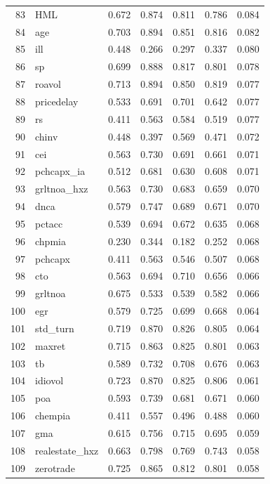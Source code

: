 \begin{footnotesize}
\begin{longtable}{rl|c|c|c|c|c}
		83 & HML & 0.672 & 0.874 & 0.811 & 0.786 & 0.084 \\ 
		84 & age & 0.703 & 0.894 & 0.851 & 0.816 & 0.082 \\ 
		85 & ill & 0.448 & 0.266 & 0.297 & 0.337 & 0.080 \\ 
		86 & sp & 0.699 & 0.888 & 0.817 & 0.801 & 0.078 \\ 
		87 & roavol & 0.713 & 0.894 & 0.850 & 0.819 & 0.077 \\ 
		88 & pricedelay & 0.533 & 0.691 & 0.701 & 0.642 & 0.077 \\ 
		89 & rs & 0.411 & 0.563 & 0.584 & 0.519 & 0.077 \\ 
		90 & chinv & 0.448 & 0.397 & 0.569 & 0.471 & 0.072 \\ 
		91 & cei & 0.563 & 0.730 & 0.691 & 0.661 & 0.071 \\ 
		92 & pchcapx\_ia & 0.512 & 0.681 & 0.630 & 0.608 & 0.071 \\ 
		93 & grltnoa\_hxz & 0.563 & 0.730 & 0.683 & 0.659 & 0.070 \\ 
		94 & dnca & 0.579 & 0.747 & 0.689 & 0.671 & 0.070 \\ 
		95 & pctacc & 0.539 & 0.694 & 0.672 & 0.635 & 0.068 \\ 
		96 & chpmia & 0.230 & 0.344 & 0.182 & 0.252 & 0.068 \\ 
		97 & pchcapx & 0.411 & 0.563 & 0.546 & 0.507 & 0.068 \\ 
		98 & cto & 0.563 & 0.694 & 0.710 & 0.656 & 0.066 \\ 
		99 & grltnoa & 0.675 & 0.533 & 0.539 & 0.582 & 0.066 \\ 
		100 & egr & 0.579 & 0.725 & 0.699 & 0.668 & 0.064 \\ 
		101 & std\_turn & 0.719 & 0.870 & 0.826 & 0.805 & 0.064 \\ 
		102 & maxret & 0.715 & 0.863 & 0.825 & 0.801 & 0.063 \\ 
		103 & tb & 0.589 & 0.732 & 0.708 & 0.676 & 0.063 \\ 
		104 & idiovol & 0.723 & 0.870 & 0.825 & 0.806 & 0.061 \\ 
		105 & poa & 0.593 & 0.739 & 0.681 & 0.671 & 0.060 \\ 
		106 & chempia & 0.411 & 0.557 & 0.496 & 0.488 & 0.060 \\ 
		107 & gma & 0.615 & 0.756 & 0.715 & 0.695 & 0.059 \\ 
		108 & realestate\_hxz & 0.663 & 0.798 & 0.769 & 0.743 & 0.058 \\ 
		109 & zerotrade & 0.725 & 0.865 & 0.812 & 0.801 & 0.058 \\ 

\end{longtable}
\end{footnotesize}

